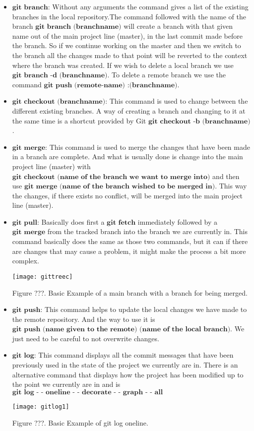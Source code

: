 \documentclass{article}
\begin{document}
\begin{itemize}
	\item $\textbf{git branch:}$  Without any arguments the command gives a list of the existing branches in the local repository.The command followed with the name of the branch $\textbf{git branch (branchname)}$ will create a branch with that given name out of the main project line (master), in the last commit made before the branch. So if we continue working on the master and then we switch to the branch all the changes made to that point will be reverted to the context where the branch was created.  If we wish to delete a local branch we use $\textbf{git branch -d (branchname)}$. To delete a remote branch we use the command $\textbf{git push (remote-name) :(branchname)}$.
	\item $\textbf{git checkout (branchname):}$ This command is used to change between the different existing branches. A way of creating a branch and changing to it at the same time is a shortcut provided by Git $\textbf{git checkout -b (branchname)}$. 
	\item $\textbf{git merge:}$ This command is used to merge the changes that have been made in a branch are complete. And what is usually done is change into the main project line (master) with $\textbf{git checkout (name of the branch we want to merge into)}$ and then use $\textbf{git merge (name of the branch wished to be merged in)}$. This way the changes, if there exists no conflict, will be merged into the main project line (master).
	\item $\textbf{git pull:}$ Basically does first a $\textbf{git fetch}$ immediately followed by a $\textbf{git merge}$ from the tracked branch into the branch we are currently in. This command basically does the same as those two commands, but it can if there are changes that may cause a problem, it might make the process a bit more complex. 

\begin{center}
	\texttt{[image: gittreec]}

Figure ???. Basic Example of a main branch with a branch for being merged.
\end{center}
	
	\item $\textbf{git push:}$ This command helps to update the local changes we have made to the remote repository. And the way to use it is $\textbf{git push (name given to the remote) (name of the local branch)}$. We just need to be careful to not overwrite changes. 
	\item $\textbf{git log:}$  This command displays all the commit messages that have been previously used in the state of the project we currently are in. There is an alternative command that displays how the project has been modified up to the point we currently are in and is $\textbf{git log - - oneline  - - decorate - - graph - - all}$

\begin{center}
	\texttt{[image: gitlog1]}

Figure ???. Basic Example of git log oneline.
\end{center}



\end{itemize}
\end{document}
